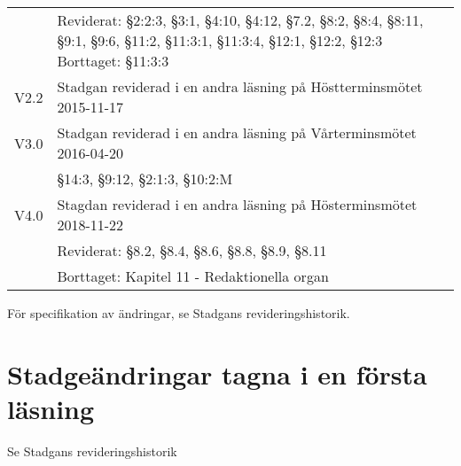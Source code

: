\documentclass[10pt]{article}
\begin{document}
\begin{tabular}{p{7mm} p{110mm}}
        & Reviderat: §2:2:3, §3:1, §4:10, §4:12, §7.2, §8:2, §8:4, §8:11, §9:1, §9:6, §11:2, §11:3:1,
        §11:3:4, §12:1, §12:2, §12:3
        Borttaget: §11:3:3\\
        V2.2 & Stadgan reviderad i en andra läsning på Höstterminsmötet 2015-11-17\\
        V3.0 & Stadgan reviderad i en andra läsning på Vårterminsmötet 2016-04-20\\
        & \S14:3, \S9:12, \S2:1:3, \S10:2:M\\
        V4.0 & Stagdan reviderad i en andra läsning på Hösterminsmötet 2018-11-22\\
        & Reviderat: \S8.2, \S8.4, \S8.6, \S8.8, \S8.9, \S8.11\\
        & Borttaget: Kapitel 11 - Redaktionella organ\\
    \end{tabular}
    \renewcommand*\arraystretch{1.3}
    
    För specifikation av ändringar, se Stadgans revideringshistorik.
    
    \section*{Stadgeändringar tagna i en första läsning}
    
    Se Stadgans revideringshistorik
    
    
\end{document}
